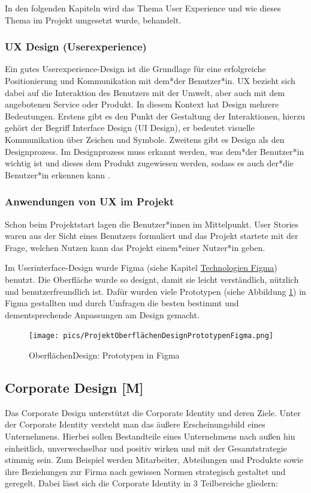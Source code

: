 In den folgenden Kapiteln wird das Thema User Experience und wie dieses Thema im Projekt umgesetzt wurde, behandelt.
\subsubsection{UX Design (Userexperience)}
Ein gutes Userexperience-Design ist die Grundlage für eine erfolgreiche Positionierung und Kommunikation mit dem*der Benutzer*in.
UX bezieht sich dabei auf die Interaktion des Benutzers mit der Umwelt, aber auch mit dem angebotenen Service oder Produkt. In diesem Kontext hat Design mehrere Bedeutungen.
Erstens gibt es den Punkt der Gestaltung der Interaktionen, hierzu gehört der Begriff Interface Design (UI Design), er bedeutet visuelle Kommunikation über Zeichen und Symbole.
Zweitens gibt es Design als den Designprozess. Im Designprozess muss erkannt werden, was dem*der Benutzer*in wichtig ist und dieses dem Produkt zugewiesen werden, sodass es auch der*die Benutzer*in erkennen kann \cite{UserExperienceDesign}.

\subsubsection{Anwendungen von UX im Projekt}
Schon beim Projektstart lagen die Benutzer*innen im Mittelpunkt. User Stories waren aus der Sicht eines Benutzers formuliert und das Projekt startete mit der Frage, welchen Nutzen kann das Projekt einem*einer Nutzer*in geben.

Im Userinterface-Design wurde Figma (siehe Kapitel \hyperref[ch::technologies::figma]{Technologien Figma}) benutzt. Die Oberfläche wurde so designt, damit sie leicht verständlich, nützlich und benutzerfreundlich ist. Dafür wurden viele Prototypen (siehe Abbildung \ref{fig:impl:design:prototypesfigma}) in Figma gestallten und durch Umfragen die besten bestimmt und dementsprechende Anpassungen am Design gemacht.

\begin{figure}
    \centering
    \texttt{[image: pics/ProjektOberflächenDesignPrototypenFigma.png]}
    \caption{OberflächenDesign: Prototypen in Figma}
    \label{fig:impl:design:prototypesfigma}
\end{figure}

\subsection{Corporate Design [M]}
Das Corporate Design unterstützt die Corporate Identity und deren Ziele. Unter der Corporate Identity versteht man das äußere Erscheinungsbild eines Unternehmens. Hierbei sollen Bestandteile eines Unternehmens nach außen hin einheitlich, unverwechselbar und positiv wirken und mit der Gesamtstrategie stimmig sein. Zum Beispiel werden Mitarbeiter, Abteilungen und Produkte sowie ihre Beziehungen zur Firma nach gewissen Normen strategisch gestaltet und geregelt. Dabei lässt sich die Corporate Identity in 3 Teilbereiche gliedern:

